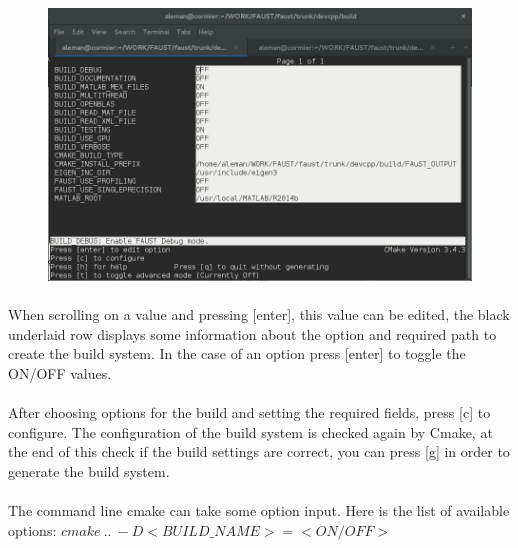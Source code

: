\begin{figure}[!htbp]
\label{fig:ccmake}
\includegraphics[scale=0.5]{images/ccmake.jpg}
\end{figure}

\paragraph{}When scrolling on a value and pressing [enter], this value can be edited, the black underlaid row displays some information about the option and required path to create the build system. In the case of an option press [enter] to toggle the ON/OFF values.
\paragraph{}After choosing options for the build and setting the required fields, press [c] to configure. The configuration of the build system is checked again by Cmake, at the end of this check if the build settings are correct, you can press [g] in order to generate the build system.
	

\paragraph{} The command line cmake can take some option input. Here is the list of available options: 
\texttt{$cmake\ ..\ -D<BUILD\_NAME>=<ON/OFF>$}

